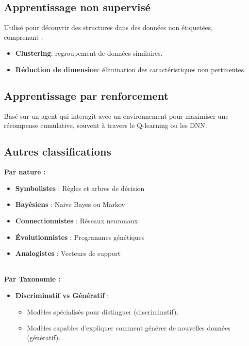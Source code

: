 \documentclass[a4paper,portrait]{article}
\begin{document}
\begin{multicols}{2}
\subsection{Apprentissage non supervisé}
Utilisé pour découvrir des structures dans des données non étiquetées, comprenant :

\begin{itemize}
    \item \textbf{Clustering}:  regroupement de données similaires.
    \item \textbf{Réduction de dimension}: élimination des caractéristiques non pertinentes.
\end{itemize}

\subsection{Apprentissage par renforcement}
Basé sur un agent qui interagit avec un environnement pour maximiser une récompense cumulative, souvent à travers le Q-learning ou les DNN.


\subsection{Autres classifications}

\textbf{Par nature :}
\begin{itemize}
    \item \textbf{Symbolistes} : Règles et arbres de décision
    \item \textbf{Bayésiens} : Naive Bayes ou Markov
    \item \textbf{Connectionnistes} : Réseaux neuronaux
    \item \textbf{Évolutionnistes} : Programmes génétiques
    \item \textbf{Analogistes} : Vecteurs de support
\end{itemize}

\textbf{\\Par Taxonomie :}

\begin{itemize}
    \item \textbf{Discriminatif vs Génératif} :
    \begin{itemize}
        \item Modèles spécialisés pour distinguer (discriminatif).
        \item Modèles capables d'expliquer comment générer de nouvelles données (génératif).
    \end{itemize}
    

\end{itemize}
\end{multicols}
\end{document}
